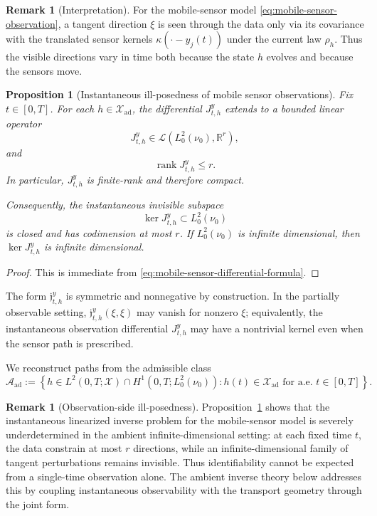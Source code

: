 \documentclass{article}
\newtheorem{proposition}[theorem]{Proposition}
\theoremstyle{definition}
\newtheorem{remark}[theorem]{Remark}
\begin{document}
\begin{remark}[Interpretation]
    \label{rem:localized-sensor-interpretation}
    For the mobile-sensor model \eqref{eq:mobile-sensor-observation}, a tangent direction \(\xi\) is
    seen through the data only via its covariance with the translated sensor kernels
    \(\kappa(\cdot-y_j(t))\) under the current law \(\rho_h\). Thus the visible directions vary in time
    both because the state \(h\) evolves and because the sensors move.
\end{remark}

\begin{proposition}[Instantaneous ill-posedness of mobile sensor observations]
    \label{prop:localized-sensor-illposedness}
    Fix \(t\in[0,T]\). For each \(h\in\mathcal X_{\mathrm{ad}}\), the differential
    \(J_{t,h}^{y}\) extends to a bounded linear operator
    \[
        J_{t,h}^{y}\in\mathcal L(L^2_0(\nu_0),\mathbb R^r),
    \]
    and
    \[
        \operatorname{rank}J_{t,h}^{y}\le r.
    \]
    In particular, \(J_{t,h}^{y}\) is finite-rank and therefore compact.

    Consequently, the instantaneous invisible subspace
    \[
        \ker J_{t,h}^{y}\subset L^2_0(\nu_0)
    \]
    is closed and has codimension at most \(r\). If \(L^2_0(\nu_0)\) is infinite dimensional, then
    \(\ker J_{t,h}^{y}\) is infinite dimensional.
\end{proposition}

\begin{proof}
    This is immediate from \eqref{eq:mobile-sensor-differential-formula}.
\end{proof}

The form \(\mathfrak j_{t,h}^{y}\) is symmetric and nonnegative by construction. In the partially
observable setting, \(\mathfrak j_{t,h}^{y}(\xi,\xi)\) may vanish for nonzero \(\xi\); equivalently,
the instantaneous observation differential \(J_{t,h}^{y}\) may have a nontrivial kernel even when the
sensor path is prescribed.

We reconstruct paths from the admissible class
\[
    \mathcal A_{\mathrm{ad}}
    :=
    \left\{
    h\in L^2(0,T;\mathcal X)\cap H^1(0,T;L^2_0(\nu_0))
    :
    h(t)\in \mathcal X_{\mathrm{ad}}
    \text{ for a.e.\ } t\in[0,T]
    \right\}.
\]

\begin{remark}[Observation-side ill-posedness]
    \label{rem:localized-sensor-illposedness}
    Proposition~\ref{prop:localized-sensor-illposedness} shows that the instantaneous linearized inverse
    problem for the mobile-sensor model is severely underdetermined in the ambient
    infinite-dimensional setting: at each fixed time \(t\), the data constrain at most \(r\) directions,
    while an infinite-dimensional family of tangent perturbations remains invisible. Thus
    identifiability cannot be expected from a single-time observation alone. The ambient inverse theory
    below addresses this by coupling instantaneous observability with the transport geometry through the
    joint form.
\end{remark}
\end{document}
